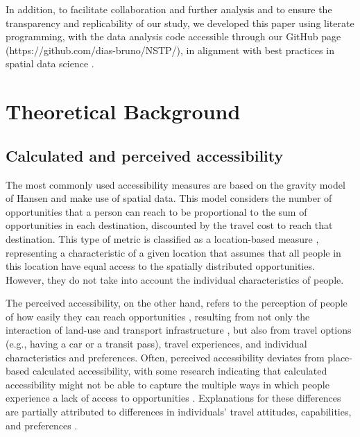 \documentclass[preprint, 3p,
authoryear]{elsarticle} %
\begin{document}
In addition, to facilitate collaboration and further analysis and to
ensure the transparency and replicability of our study, we developed
this paper using literate programming, with the data analysis code
accessible through our GitHub page
(https://github.com/dias-bruno/NSTP/), in alignment with best practices
in spatial data science \citep{páez2021, arribas-bel2021}.

\section{Theoretical Background}\label{theoretical-background}

\subsection{Calculated and perceived
accessibility}\label{calculated-and-perceived-accessibility}

The most commonly used accessibility measures are based on the gravity
model of Hansen \citeyearpar{hansen1959} and make use of spatial data.
This model considers the number of opportunities that a person can reach
to be proportional to the sum of opportunities in each destination,
discounted by the travel cost to reach that destination. This type of
metric is classified as a location-based measure \citep{pereira2023},
representing a characteristic of a given location that assumes that all
people in this location have equal access to the spatially distributed
opportunities. However, they do not take into account the individual
characteristics of people.

The perceived accessibility, on the other hand, refers to the perception
of people of how easily they can reach opportunities
\citep{lättman2016, pot2025, mehdizadeh2025}, resulting from not only
the interaction of land-use and transport infrastructure
\citep{geurs2004}, but also from travel options (e.g., having a car or a
transit pass), travel experiences, and individual characteristics and
preferences. Often, perceived accessibility deviates from place-based
calculated accessibility, with some research indicating that calculated
accessibility might not be able to capture the multiple ways in which
people experience a lack of access to opportunities \citep{zhu2025}.
Explanations for these differences are partially attributed to
differences in individuals' travel attitudes, capabilities, and
preferences \citep{devos2025, vandervlugt2022}.
\end{document}
